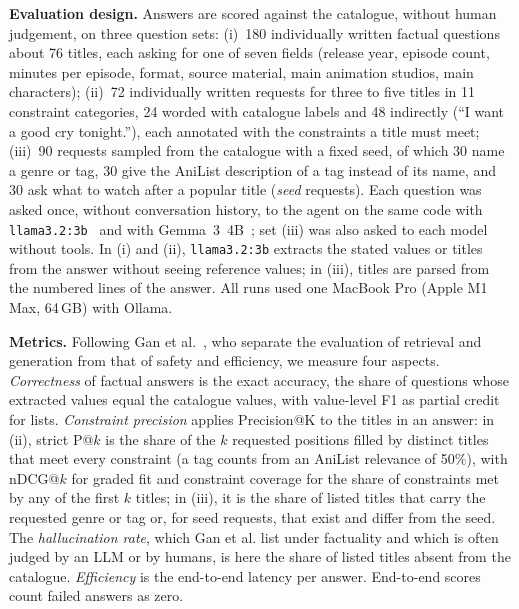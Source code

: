 \documentclass[a4paper,10pt]{article}
\begin{document}
\textbf{Evaluation design.} Answers are scored against the catalogue, without human judgement, on three question sets: (i)~180 individually written factual questions about 76 titles, each asking for one of seven fields (release year, episode count, minutes per episode, format, source material, main animation studios, main characters); (ii)~72 individually written requests for three to five titles in 11 constraint categories, 24 worded with catalogue labels and 48 indirectly (``I want a good cry tonight.''), each annotated with the constraints a title must meet; (iii)~90 requests sampled from the catalogue with a fixed seed, of which 30 name a genre or tag, 30 give the AniList description of a tag instead of its name, and 30 ask what to watch after a popular title (\emph{seed} requests). Each question was asked once, without conversation history, to the agent on the same code with \texttt{llama3.2:3b}~\cite{llama32} and with Gemma~3~4B~\cite{gemma3}; set (iii) was also asked to each model without tools. In (i) and (ii), \texttt{llama3.2:3b} extracts the stated values or titles from the answer without seeing reference values; in (iii), titles are parsed from the numbered lines of the answer. All runs used one MacBook Pro (Apple M1 Max, 64\,GB) with Ollama.

\textbf{Metrics.} Following Gan et al.~\cite{gan2025rageval}, who separate the evaluation of retrieval and generation from that of safety and efficiency, we measure four aspects. \emph{Correctness} of factual answers is the exact accuracy, the share of questions whose extracted values equal the catalogue values, with value-level F1 as partial credit for lists. \emph{Constraint precision} applies Precision@K to the titles in an answer: in (ii), strict P@$k$ is the share of the $k$ requested positions filled by distinct titles that meet every constraint (a tag counts from an AniList relevance of 50\%), with nDCG@$k$ for graded fit and constraint coverage for the share of constraints met by any of the first $k$ titles; in (iii), it is the share of listed titles that carry the requested genre or tag or, for seed requests, that exist and differ from the seed. The \emph{hallucination rate}, which Gan et al. list under factuality and which is often judged by an LLM or by humans, is here the share of listed titles absent from the catalogue. \emph{Efficiency} is the end-to-end latency per answer. End-to-end scores count failed answers as zero.
\end{document}
